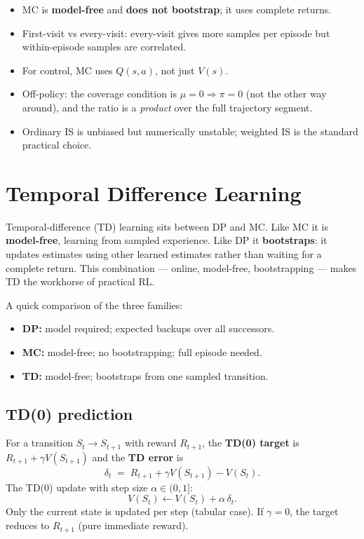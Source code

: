 \documentclass[11pt, oneside]{book}
\begin{document}
\begin{notebox}[title={Common Exam Pitfalls — MC}]
\begin{itemize}
  \item MC is \textbf{model-free} and \textbf{does not bootstrap}; it uses complete returns.
  \item First-visit vs every-visit: every-visit gives more samples per
    episode but within-episode samples are correlated.
  \item For control, MC uses $Q(s,a)$, not just $V(s)$.
  \item Off-policy: the coverage condition is $\mu=0 \Rightarrow \pi=0$
    (not the other way around), and the ratio is a \emph{product} over the
    full trajectory segment.
  \item Ordinary IS is unbiased but numerically unstable;
    weighted IS is the standard practical choice.
\end{itemize}
\end{notebox}


\chapter{Temporal Difference Learning}

Temporal-difference (TD) learning sits between DP and MC.
Like MC it is \textbf{model-free}, learning from sampled experience.
Like DP it \textbf{bootstraps}: it updates estimates using other learned
estimates rather than waiting for a complete return.
This combination --- online, model-free, bootstrapping --- makes TD the
workhorse of practical RL.

A quick comparison of the three families:
\begin{itemize}
  \item \textbf{DP:} model required; expected backups over all successors.
  \item \textbf{MC:} model-free; no bootstrapping; full episode needed.
  \item \textbf{TD:} model-free; bootstraps from one sampled transition.
\end{itemize}

\section{TD(0) prediction}

\begin{thmbox}[title={TD(0) Target and Error}]
For a transition $S_t \to S_{t+1}$ with reward $R_{t+1}$, the
\textbf{TD(0) target} is $R_{t+1} + \gamma V(S_{t+1})$ and the
\textbf{TD error} is
\[
  \delta_t \;=\; R_{t+1} + \gamma V(S_{t+1}) - V(S_t).
\]
The TD(0) update with step size $\alpha \in (0,1]$:
\[
  V(S_t) \leftarrow V(S_t) + \alpha\,\delta_t.
\]
Only the current state is updated per step (tabular case). If $\gamma=0$,
the target reduces to $R_{t+1}$ (pure immediate reward).
\end{thmbox}
\end{document}
